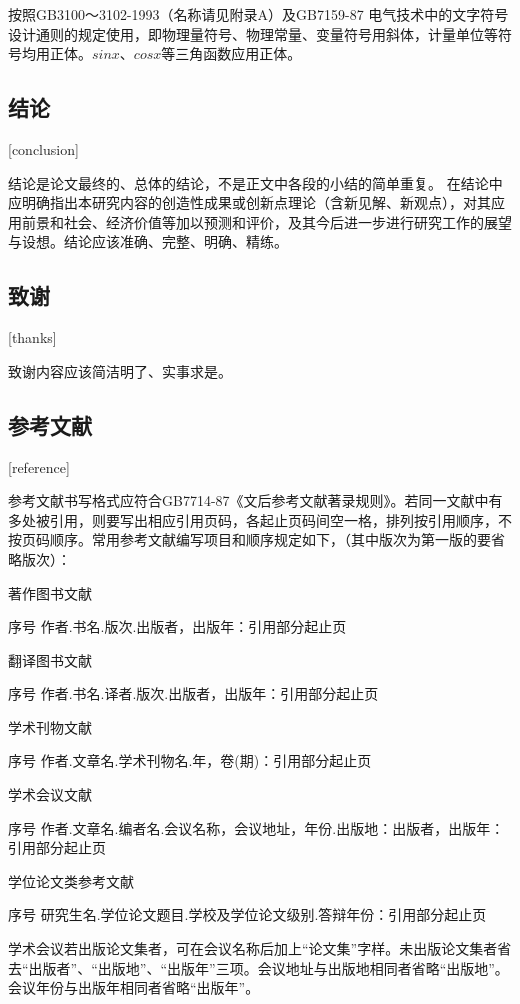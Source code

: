 按照GB3100～3102-1993（名称请见附录A）及GB7159-87 电气技术中的文字符号设计通则的规定使用，即物理量符号、物理常量、变量符号用斜体，计量单位等符号均用正体。$sin{x}$、$cos{x}$等三角函数应用正体。

\subsection{结论}[conclusion]

结论是论文最终的、总体的结论，不是正文中各段的小结的简单重复。
在结论中应明确指出本研究内容的创造性成果或创新点理论（含新见解、新观点），对其应用前景和社会、经济价值等加以预测和评价，及其今后进一步进行研究工作的展望与设想。结论应该准确、完整、明确、精练。

\subsection{致谢}[thanks]

致谢内容应该简洁明了、实事求是。

\subsection{参考文献}[reference]

参考文献书写格式应符合GB7714-87《文后参考文献著录规则》。若同一文献中有多处被引用，则要写出相应引用页码，各起止页码间空一格，排列按引用顺序，不按页码顺序。常用参考文献编写项目和顺序规定如下，（其中版次为第一版的要省略版次）：

著作图书文献

序号 \quad 作者.书名.版次.出版者，出版年：引用部分起止页

翻译图书文献

序号 \quad 作者.书名.译者.版次.出版者，出版年：引用部分起止页

学术刊物文献

序号 \quad 作者.文章名.学术刊物名.年，卷(期)：引用部分起止页

学术会议文献

序号 \quad 作者.文章名.编者名.会议名称，会议地址，年份.出版地：出版者，出版年：引用部分起止页

学位论文类参考文献

序号 \quad 研究生名.学位论文题目.学校及学位论文级别.答辩年份：引用部分起止页

学术会议若出版论文集者，可在会议名称后加上“论文集”字样。未出版论文集者省去“出版者”、“出版地”、“出版年”三项。会议地址与出版地相同者省略“出版地”。会议年份与出版年相同者省略“出版年”。

